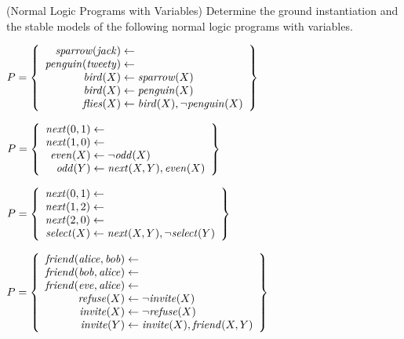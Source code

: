 \begin{Uebung}{(Normal Logic Programs with Variables)}%
Determine 
the ground instantiation
and the stable models of the following
normal logic programs with variables.
\begin{UList}
\item
\(
P =
\left\{
\begin{array}{r@{{}\leftarrow{}}l}
    \mathit{sparrow}(\mathit{jack})        \\
    \mathit{penguin}(\mathit{tweety})      \\
    \mathit{bird}(X)  & \mathit{sparrow}(X) \\
    \mathit{bird}(X)  & \mathit{penguin}(X) \\
    \mathit{flies}(X) & \mathit{bird}(X), \naf{\mathit{penguin}(X)}
\end{array}
\right\}
\)
\item 
\(
P =
\left\{
\begin{array}{r@{{}\leftarrow{}}l}
    \mathit{next}(0,1) \\
    \mathit{next}(1,0) \\
    \mathit{even}(X) & \naf{\mathit{odd}(X)} \\
    \mathit{odd}(Y)  & \mathit{next}(X,Y), \mathit{even}(X)
\end{array}
\right\}
\)
\item
\(
P =
\left\{
\begin{array}{r@{{}\leftarrow{}}l}
    \mathit{next}(0,1) \\
    \mathit{next}(1,2) \\
    \mathit{next}(2,0) \\
    \mathit{select}(X)   & \mathit{next}(X,Y), \naf{\mathit{select}(Y)}
\end{array}
\right\}
\)
\item
\(
P =
\left\{
\begin{array}{r@{{}\leftarrow{}}l}
    \mathit{friend}(\mathit{alice},\mathit{bob})  \\
    \mathit{friend}(\mathit{bob},\mathit{alice})  \\
    \mathit{friend}(\mathit{eve},\mathit{alice})  \\
    \mathit{refuse}(X) & \naf{\mathit{invite}(X)} \\
    \mathit{invite}(X) & \naf{\mathit{refuse}(X)} \\
    \mathit{invite}(Y) & \mathit{invite}(X), \mathit{friend}(X,Y)
\end{array}
\right\}
\)
\end{UList}
\end{Uebung}

